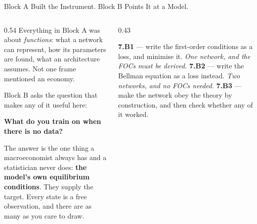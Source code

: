 \begin{frame}{Block A Built the Instrument. Block B Points It at a Model.}
\begin{columns}[T]
\begin{column}{0.54\textwidth}
\small
Everything in Block A was about \emph{functions}: what a network can represent, how its parameters are found, what an architecture assumes. Not one frame mentioned an economy.
\medskip

Block B asks the question that makes any of it useful here:
\medskip

\begin{center}
\textbf{What do you train on when there is no data?}
\end{center}
\medskip

The answer is the one thing a macroeconomist always has and a statistician never does: \textbf{the model's own equilibrium conditions}. They supply the target. Every state is a free observation, and there are as many as you care to draw.
\end{column}
\begin{column}{0.43\textwidth}
\begin{conceptbox}[title=\textbf{The three decks}]\small
\textbf{7.B1} --- write the first-order conditions as a loss, and minimise it. \emph{One network, and the FOCs must be derived.}
\medskip
\textbf{7.B2} --- write the Bellman equation as a loss instead. \emph{Two networks, and no FOCs needed.}
\medskip
\textbf{7.B3} --- make the network obey the theory by construction, and then check whether any of it worked.
\end{conceptbox}
\end{column}
\end{columns}
\end{frame}

